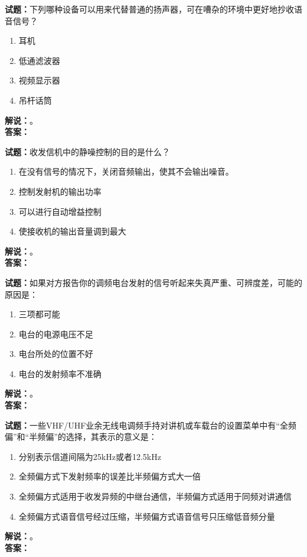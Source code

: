 \documentclass{ctexbook}
\begin{document}
\noindent\textbf{试题：}下列哪种设备可以用来代替普通的扬声器，可在嘈杂的环境中更好地抄收语音信号？
\begin{enumerate}[leftmargin=3em]
\item 耳机
\item 低通滤波器
\item 视频显示器
\item 吊杆话筒
\end{enumerate}
\noindent\textbf{解说：}\textbf{}。\\\noindent\textbf{答案：}

\bigskip




\noindent\textbf{试题：}收发信机中的静噪控制的目的是什么？
\begin{enumerate}[leftmargin=3em]
\item 在没有信号的情况下，关闭音频输出，使其不会输出噪音。
\item 控制发射机的输出功率
\item 可以进行自动增益控制
\item 使接收机的输出音量调到最大
\end{enumerate}
\noindent\textbf{解说：}\textbf{}。\\\noindent\textbf{答案：}

\bigskip




\noindent\textbf{试题：}如果对方报告你的调频电台发射的信号听起来失真严重、可辨度差，可能的原因是：
\begin{enumerate}[leftmargin=3em]
\item 三项都可能
\item 电台的电源电压不足
\item 电台所处的位置不好
\item 电台的发射频率不准确
\end{enumerate}
\noindent\textbf{解说：}\textbf{}。\\\noindent\textbf{答案：}

\bigskip




\noindent\textbf{试题：}一些VHF/UHF业余无线电调频手持对讲机或车载台的设置菜单中有“全频偏”和“半频偏”的选择，其表示的意义是：
\begin{enumerate}[leftmargin=3em]
\item 分别表示信道间隔为25\unit{\kHz}或者12.5\unit{\kHz}
\item 全频偏方式下发射频率的误差比半频偏方式大一倍
\item 全频偏方式适用于收发异频的中继台通信，半频偏方式适用于同频对讲通信
\item 全频偏方式语音信号经过压缩，半频偏方式语音信号只压缩低音频分量
\end{enumerate}
\noindent\textbf{解说：}\textbf{}。\\\noindent\textbf{答案：}
\end{document}
